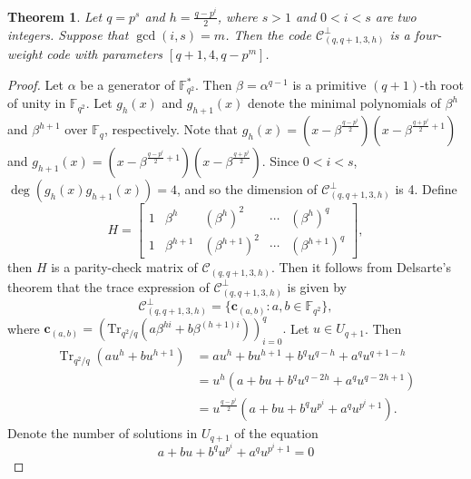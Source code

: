 \documentclass[sn-mathphys-num]{sn-jnl}%
\theoremstyle{thmstyleone}%
\newtheorem{theorem}{Theorem}%
\theoremstyle{thmstyletwo}%
\theoremstyle{thmstylethree}%
\begin{document}
\begin{theorem}\label{sec3 thm1}
	Let $q=p^s$ and $h=\frac{q-p^i}{2}$, where $s>1$ and $0<i<s$ are two integers. Suppose that $\gcd(i,s)=m$. Then the code $\mathcal{C}^\perp_{(q,q+1,3,h)}$ is a four-weight code with parameters $[q+1,4,q-p^m]$.
\end{theorem}
\begin{proof}
	Let $\alpha$ be a generator of $\mathbb{F}_{q^2}^{\ast}$. Then $\beta=\alpha^{q-1}$ is a primitive $(q+1)$-th root of unity in $\mathbb{F}_{q^2}$. Let $g_h(x)$ and $g_{h+1}(x)$ denote the minimal polynomials of $\beta^h$ and $\beta^{h+1}$ over $\mathbb{F}_q$, respectively. Note that $g_h(x)=(x-\beta^{\frac{q-p^i}{2}})(x-\beta^{\frac{q+p^i}{2}+1})$ and $g_{h+1}(x)=(x-\beta^{\frac{q-p^i}{2}+1})(x-\beta^{\frac{q+p^i}{2}})$. Since $0<i<s$, $\deg(g_h(x)g_{h+1}(x))=4$, and so the dimension of $\mathcal{C}^\perp_{(q,q+1,3,h)}$ is 4. Define
	\begin{equation*}
		\left.H=\left[\begin{array}{lllll}1&\beta^{h}&(\beta^{h})^2&\cdots&(\beta^{h})^q\\1&\beta^{h+1}&(\beta^{h+1})^2&\cdots&(\beta^{h+1})^q\end{array}\right.\right],
	\end{equation*}
	then $H$ is a parity-check matrix of $\mathcal{C}_{(q,q+1,3,h)}$. Then it follows from Delsarte’s theorem \cite[Theorem 2]{Delsarte1975SubfieldSubcodesModified} that the trace expression of $\mathcal{C}_{(q,q+1,3,h)}^{\perp}$ is given by
	\begin{equation*}
		\mathcal{C}_{(q,q+1,3,h)}^\perp=\{\mathbf{c}_{(a,b)}:a,b\in\mathbb{F}_{q^2}\},
	\end{equation*}
	where $\mathbf{c}_{(a,b)}=\left(\mathrm{Tr}_{q^{2}/q}\left(a\beta^{hi}+b\beta^{(h+1)i}\right)\right)_{i=0}^{q}.$ Let $u \in U_{q+1}$. Then 
	\begin{equation}
		\label{sec3 thm1 equ1}
		\begin{aligned}
			\operatorname{Tr}_{q^2/q}(au^h+bu^{h+1})&=au^h+bu^{h+1}+b^qu^{q-h}+a^qu^{q+1-h}\\&=u^{h}(a+bu+b^qu^{q-2h}+a^qu^{q-2h+1})\\&=u^{\frac{q-p^i}{2}}(a+bu+b^qu^{p^i}+a^qu^{p^i+1}).
		\end{aligned}
	\end{equation}
	Denote the number of solutions in $U_{q+1}$ of the equation
	\begin{equation}
		\label{sec3 thm1 equ2}
		a+bu+b^qu^{p^i}+a^qu^{p^i+1}=0
	\end{equation}

\end{proof}
\end{document}
